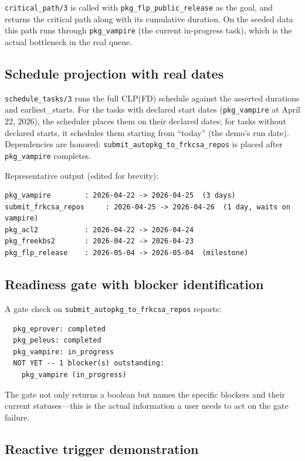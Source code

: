 \documentclass[11pt,letterpaper]{article}
\begin{document}
\texttt{critical\_path/3} is called with \texttt{pkg\_flp\_public\_release}
as the goal, and returns the critical path along with its cumulative
duration. On the seeded data this path runs through \texttt{pkg\_vampire}
(the current in-progress task), which is the actual bottleneck in the
real queue.

\subsection{Schedule projection with real dates}

\texttt{schedule\_tasks/3} runs the full CLP(FD) schedule against the
asserted durations and earliest\_starts. For the tasks with declared start
dates (\texttt{pkg\_vampire} at April 22, 2026), the scheduler places them
on their declared dates; for tasks without declared starts, it schedules
them starting from ``today'' (the demo's run date). Dependencies are
honored: \texttt{submit\_autopkg\_to\_frkcsa\_repos} is placed after
\texttt{pkg\_vampire} completes.

Representative output (edited for brevity):

\begin{lstlisting}
pkg_vampire        : 2026-04-22 -> 2026-04-25  (3 days)
submit_frkcsa_repos     : 2026-04-25 -> 2026-04-26  (1 day, waits on vampire)
pkg_acl2           : 2026-04-22 -> 2026-04-24
pkg_freekbs2       : 2026-04-22 -> 2026-04-23
pkg_flp_release    : 2026-05-04 -> 2026-05-04  (milestone)
\end{lstlisting}

\subsection{Readiness gate with blocker identification}

A gate check on \texttt{submit\_autopkg\_to\_frkcsa\_repos} reports:

\begin{lstlisting}
  pkg_eprover: completed
  pkg_peleus: completed
  pkg_vampire: in_progress
  NOT YET -- 1 blocker(s) outstanding:
    pkg_vampire (in_progress)
\end{lstlisting}

The gate not only returns a boolean but names the specific blockers and
their current statuses---this is the actual information a user needs to
act on the gate failure.

\subsection{Reactive trigger demonstration}
\end{document}
